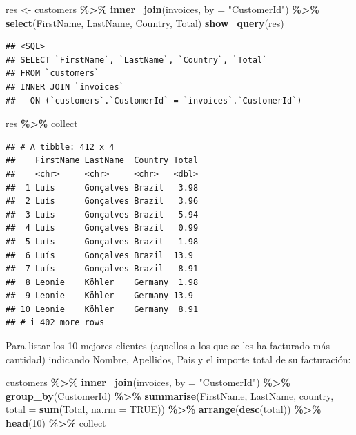 \documentclass[
]{book}
\newenvironment{Shaded}{\begin{snugshade}}{\end{snugshade}}
\newcommand{\AttributeTok}[1]{\textcolor[rgb]{0.13,0.29,0.53}{#1}}
\newcommand{\ConstantTok}[1]{\textcolor[rgb]{0.56,0.35,0.01}{#1}}
\newcommand{\DecValTok}[1]{\textcolor[rgb]{0.00,0.00,0.81}{#1}}
\newcommand{\FunctionTok}[1]{\textcolor[rgb]{0.13,0.29,0.53}{\textbf{#1}}}
\newcommand{\NormalTok}[1]{#1}
\newcommand{\OtherTok}[1]{\textcolor[rgb]{0.56,0.35,0.01}{#1}}
\newcommand{\SpecialCharTok}[1]{\textcolor[rgb]{0.81,0.36,0.00}{\textbf{#1}}}
\newcommand{\StringTok}[1]{\textcolor[rgb]{0.31,0.60,0.02}{#1}}
\begin{document}
\begin{Shaded}
\begin{Highlighting}[]
\NormalTok{res }\OtherTok{\textless{}{-}}\NormalTok{ customers }\SpecialCharTok{\%\textgreater{}\%} 
  \FunctionTok{inner\_join}\NormalTok{(invoices, }\AttributeTok{by =} \StringTok{"CustomerId"}\NormalTok{) }\SpecialCharTok{\%\textgreater{}\%} 
  \FunctionTok{select}\NormalTok{(FirstName, LastName, Country, Total) }
\FunctionTok{show\_query}\NormalTok{(res)}
\end{Highlighting}
\end{Shaded}

\begin{verbatim}
## <SQL>
## SELECT `FirstName`, `LastName`, `Country`, `Total`
## FROM `customers`
## INNER JOIN `invoices`
##   ON (`customers`.`CustomerId` = `invoices`.`CustomerId`)
\end{verbatim}

\begin{Shaded}
\begin{Highlighting}[]
\NormalTok{res  }\SpecialCharTok{\%\textgreater{}\%}\NormalTok{ collect}
\end{Highlighting}
\end{Shaded}

\begin{verbatim}
## # A tibble: 412 x 4
##    FirstName LastName  Country Total
##    <chr>     <chr>     <chr>   <dbl>
##  1 Luís      Gonçalves Brazil   3.98
##  2 Luís      Gonçalves Brazil   3.96
##  3 Luís      Gonçalves Brazil   5.94
##  4 Luís      Gonçalves Brazil   0.99
##  5 Luís      Gonçalves Brazil   1.98
##  6 Luís      Gonçalves Brazil  13.9 
##  7 Luís      Gonçalves Brazil   8.91
##  8 Leonie    Köhler    Germany  1.98
##  9 Leonie    Köhler    Germany 13.9 
## 10 Leonie    Köhler    Germany  8.91
## # i 402 more rows
\end{verbatim}

Para listar los 10 mejores clientes (aquellos a los que se les ha facturado más cantidad) indicando Nombre, Apellidos, Pais y el importe total de su facturación:

\begin{Shaded}
\begin{Highlighting}[]
\NormalTok{customers }\SpecialCharTok{\%\textgreater{}\%} \FunctionTok{inner\_join}\NormalTok{(invoices, }\AttributeTok{by =} \StringTok{"CustomerId"}\NormalTok{) }\SpecialCharTok{\%\textgreater{}\%} \FunctionTok{group\_by}\NormalTok{(CustomerId) }\SpecialCharTok{\%\textgreater{}\%} 
    \FunctionTok{summarise}\NormalTok{(FirstName, LastName, country, }\AttributeTok{total =} \FunctionTok{sum}\NormalTok{(Total, }\AttributeTok{na.rm =} \ConstantTok{TRUE}\NormalTok{)) }\SpecialCharTok{\%\textgreater{}\%}  
    \FunctionTok{arrange}\NormalTok{(}\FunctionTok{desc}\NormalTok{(total)) }\SpecialCharTok{\%\textgreater{}\%} \FunctionTok{head}\NormalTok{(}\DecValTok{10}\NormalTok{) }\SpecialCharTok{\%\textgreater{}\%}\NormalTok{ collect}
\end{Highlighting}
\end{Shaded}
\end{document}
